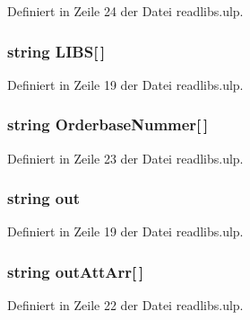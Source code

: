 Definiert in Zeile 24 der Datei readlibs.\+ulp.

\hypertarget{readlibs_8ulp_ab79ee21fe4aae7937f99de5b9c7b7d2c}{}
\subsubsection[{L\+I\+B\+S}]{\setlength{\rightskip}{0pt plus 5cm}string L\+I\+B\+S\mbox{[}$\,$\mbox{]}}\label{readlibs_8ulp_ab79ee21fe4aae7937f99de5b9c7b7d2c}


Definiert in Zeile 19 der Datei readlibs.\+ulp.

\hypertarget{readlibs_8ulp_a57ba39a1335c8ae9ef4eb8314d51160e}{}
\subsubsection[{Orderbase\+Nummer}]{\setlength{\rightskip}{0pt plus 5cm}string Orderbase\+Nummer\mbox{[}$\,$\mbox{]}}\label{readlibs_8ulp_a57ba39a1335c8ae9ef4eb8314d51160e}


Definiert in Zeile 23 der Datei readlibs.\+ulp.

\hypertarget{readlibs_8ulp_a43b9274914173cbec050c89b07f1824b}{}
\subsubsection[{out}]{\setlength{\rightskip}{0pt plus 5cm}string out}\label{readlibs_8ulp_a43b9274914173cbec050c89b07f1824b}


Definiert in Zeile 19 der Datei readlibs.\+ulp.

\hypertarget{readlibs_8ulp_a801e8dfc827f7961b6012c0100f77ab4}{}
\subsubsection[{out\+Att\+Arr}]{\setlength{\rightskip}{0pt plus 5cm}string out\+Att\+Arr\mbox{[}$\,$\mbox{]}}\label{readlibs_8ulp_a801e8dfc827f7961b6012c0100f77ab4}


Definiert in Zeile 22 der Datei readlibs.\+ulp.

